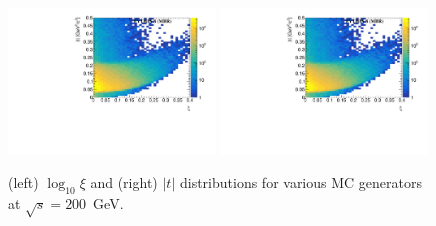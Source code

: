 \begin{figure}[h!]
	\centering
	\includegraphics[width=0.49\textwidth, page=14]{chapters/dataSampleSTAR/img/true.pdf}
	\includegraphics[width=0.49\textwidth, page=13]{chapters/dataSampleSTAR/img/true.pdf}
	\caption{(left) $\log_{10}\xi$ and  (right) $|t|$ distributions for various MC generators at $\sqrt{s} = 200$~GeV.}
	\label{fig:STARtrueMC}
\end{figure}